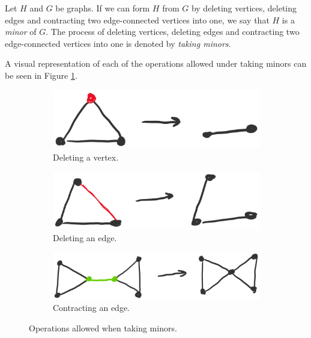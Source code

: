 \begin{definition}
Let $H$ and $G$ be graphs. If we can form $H$ from $G$ by deleting vertices, deleting edges and contracting two edge-connected vertices into one, we say that $H$ is a \emph{minor} of $G$. The process of deleting vertices, deleting edges and contracting two edge-connected vertices into one is denoted by \emph{taking minors}.
\end{definition}
A visual representation of each of the operations allowed under taking minors can be seen in Figure \ref{fig:minoroperations}.
\begin{figure}[h!]
  \centering
      \begin{subfigure}[t]{0.3\textwidth}
          \centering
          \includegraphics[width = \textwidth]{deletevertex.png}
          \caption{Deleting a vertex.}
      \end{subfigure}%
       \hfill
      \begin{subfigure}[t]{0.3\textwidth}
          \centering
          \includegraphics[width = \textwidth]{deleteedge.png}
          \caption{Deleting an edge.}
      \end{subfigure}
       \hfill
      \begin{subfigure}[t]{0.3\textwidth}
          \centering
          \includegraphics[width = \textwidth]{contractedge.png}
          \caption{Contracting an edge.}
      \end{subfigure}
      \caption{Operations allowed when taking minors.}
      \label{fig:minoroperations}
\end{figure}

